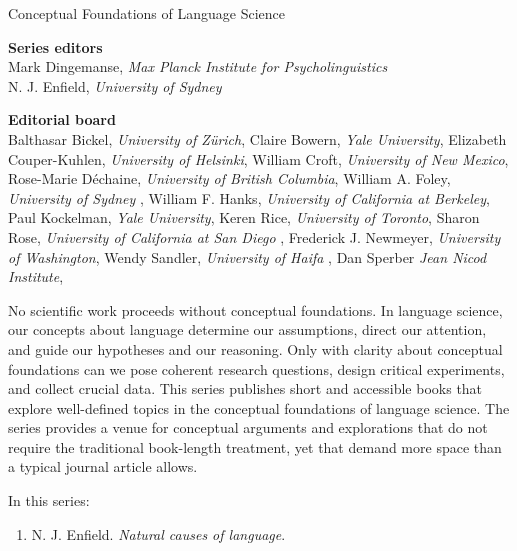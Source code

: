 {\large Conceptual Foundations of Language Science}

\bigskip

\textbf{Series editors}\\
Mark Dingemanse, \textit{Max Planck Institute for Psycholinguistics}   \\
N. J. Enfield, \textit{University of Sydney}


\bigskip


\textbf{Editorial board}\\
Balthasar Bickel, \textit{University of Zürich},    
Claire Bowern, \textit{Yale University},           
Elizabeth Couper-Kuhlen, \textit{University of Helsinki},     
William Croft, \textit{University of New Mexico},             
Rose-Marie Déchaine, \textit{University of British Columbia},       
William A. Foley, \textit{University of Sydney} ,                   
William F. Hanks, \textit{University of California at Berkeley},    
Paul Kockelman, \textit{Yale University},            
Keren Rice, \textit{University of Toronto},          
Sharon Rose, \textit{University of California at San Diego },        
Frederick J. Newmeyer, \textit{University of Washington},         
Wendy Sandler, \textit{University of Haifa },             
Dan Sperber \textit{Jean Nicod Institute},      


\bigskip

\begin{minipage}{\textwidth}%

No scientific work proceeds without conceptual foundations. In language science, our concepts about language determine our assumptions, direct our attention, and guide our hypotheses and our reasoning. Only with clarity about conceptual foundations can we pose coherent research questions, design critical experiments, and collect crucial data. 
%
This series publishes short and accessible books that explore well-defined topics in the conceptual foundations of language science. The series provides a venue for conceptual arguments and explorations that do not require the traditional book-length treatment, yet that demand more space than a typical journal article allows.  
\end{minipage}

\bigskip

In this series:

\begin{enumerate}
\item N. J. Enfield. \textit{Natural causes of language}.

\end{enumerate}


